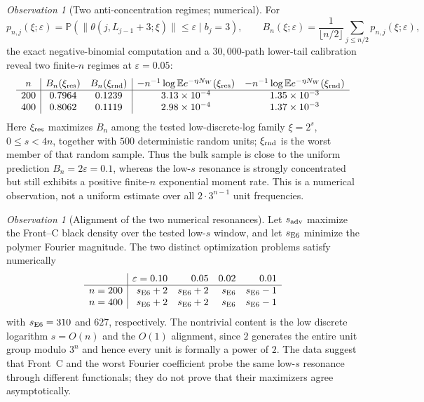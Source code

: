 \documentclass[12pt,a4paper]{article}
\theoremstyle{remark}
\newtheorem{observation}[theorem]{Observation}
\begin{document}
\begin{observation}[Two anti-concentration regimes; numerical]
\label{obs:two_ac_regimes}
For
\[
p_{n,j}(\xi;\varepsilon)=\mathbb P\!\left(\|\theta(j,L_{j-1}+3;\xi)\|
\le\varepsilon\mid b_j=3\right),\qquad
B_n(\xi;\varepsilon)=\frac1{\lfloor n/2\rfloor}\sum_{j\le n/2}p_{n,j}(\xi;\varepsilon),
\]
the exact negative-binomial computation and a $30{,}000$-path lower-tail
calibration reveal two finite-$n$ regimes at $\varepsilon=0.05$:
\[
\begin{array}{c|cc|cc}
n & B_n(\xi_{\rm res}) & B_n(\xi_{\rm rnd})
& -n^{-1}\log\mathbb E e^{-\eta N_W}(\xi_{\rm res})
& -n^{-1}\log\mathbb E e^{-\eta N_W}(\xi_{\rm rnd})\\ \hline
200&0.7964&0.1239&3.13\times10^{-4}&1.35\times10^{-3}\\
400&0.8062&0.1119&2.98\times10^{-4}&1.37\times10^{-3}
\end{array}
\]
Here $\xi_{\rm res}$ maximizes $B_n$ among the tested low-discrete-log family
$\xi=2^s$, $0\le s<4n$, together with $500$ deterministic random units;
$\xi_{\rm rnd}$ is the worst member of that random sample.  Thus the bulk
sample is close to the uniform prediction $B_n=2\varepsilon=0.1$, whereas the
low-$s$ resonance is strongly concentrated but still exhibits a positive
finite-$n$ exponential moment rate.  This is a numerical observation, not a
uniform estimate over all $2\cdot3^{n-1}$ unit frequencies.
\end{observation}
\begin{observation}[Alignment of the two numerical resonances]
\label{obs:resonance_alignment}
Let $s_{\rm adv}$ maximize the Front--C black density over the tested low-$s$
window, and let $s_{\rm E6}$ minimize the polymer Fourier magnitude.  The two
distinct optimization problems satisfy numerically
\[
\begin{array}{c|rrrr}
&\varepsilon=0.10&0.05&0.02&0.01\\ \hline
n=200&s_{\rm E6}+2&s_{\rm E6}+2&s_{\rm E6}&s_{\rm E6}-1\\
n=400&s_{\rm E6}+2&s_{\rm E6}+2&s_{\rm E6}&s_{\rm E6}-1
\end{array}
\]
with $s_{\rm E6}=310$ and $627$, respectively.  The nontrivial content is the
low discrete logarithm $s=O(n)$ and the $O(1)$ alignment, since $2$ generates
the entire unit group modulo $3^n$ and hence every unit is formally a power of
$2$.  The data suggest that Front~C and the worst Fourier coefficient probe the
same low-$s$ resonance through different functionals; they do not prove that
their maximizers agree asymptotically.
\end{observation}
\end{document}
